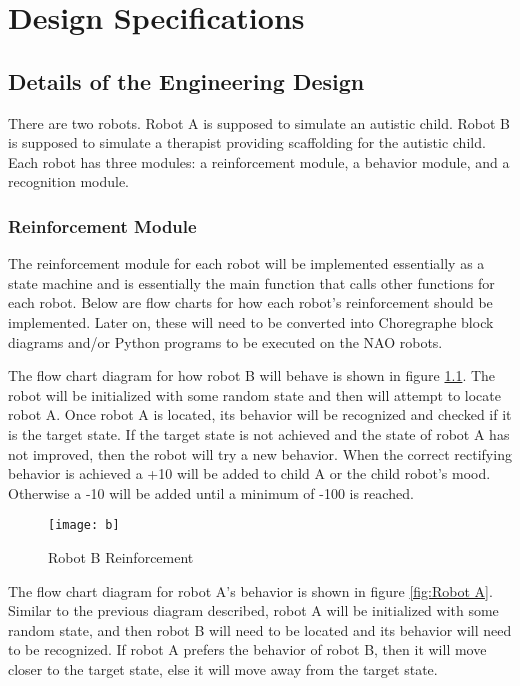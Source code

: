 \chapter{Design Specifications}
\label{ch:designspecifications}
\section{Details of the Engineering Design}
There are two robots. Robot A is supposed to simulate an autistic child. Robot B is supposed to simulate a therapist providing scaffolding for the autistic child. Each robot has three modules: a reinforcement module, a behavior module, and a recognition module.\par 
\subsection{Reinforcement Module}
The reinforcement module for each robot will be implemented essentially as a state machine and is essentially the main function that calls other functions for each robot. Below are flow charts for how each robot’s reinforcement should be implemented. Later on, these will need to be converted into Choregraphe block diagrams and/or Python programs to be executed on the NAO robots. \par 

The flow chart diagram for how robot B will behave is shown in figure \ref{fig:Robot B}. The robot will be initialized with some random state and then will attempt to locate robot A. Once robot A is located, its behavior will be recognized and checked if it is the target state. If the target state is not achieved and the state of robot A has not improved, then the robot will try a new behavior. When the correct rectifying behavior is achieved a +10 will be added to child A or the child robot’s mood. Otherwise a -10 will be added until a minimum of -100 is reached.\par 

\begin{figure}
    \centering
    \texttt{[image: b]}
    \caption{Robot B Reinforcement}
    \label{fig:Robot B}
  \end{figure}
  The flow chart diagram for robot A’s behavior is shown in figure \ref{fig:Robot A}. Similar to the previous diagram described, robot A will be initialized with some random state, and then robot B will need to be located and its behavior will need to be recognized. If robot A prefers the behavior of robot B, then it will move closer to the target state, else it will move away from the target state.\par 

